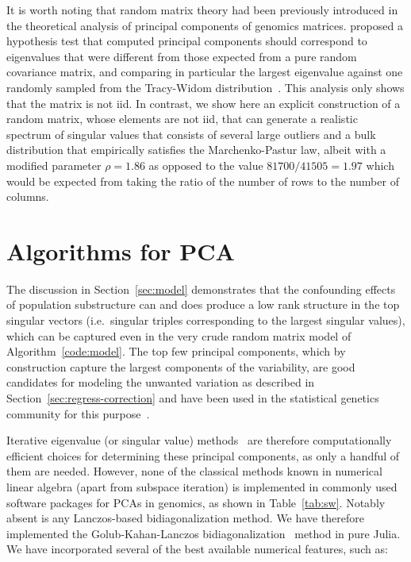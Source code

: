 \documentclass[review]{siamart0516}
\begin{document}
It is worth noting that random matrix theory had been previously introduced in
the theoretical analysis of principal components of genomics matrices.
\cite{Patterson2006} proposed a hypothesis test that computed principal components
should correspond to eigenvalues that were different from those expected from a
pure random covariance matrix,
and comparing in particular the largest eigenvalue against one randomly sampled
from the Tracy-Widom distribution~\cite{Tracy1993,Tracy1994}.
This analysis only shows that the matrix is not iid. In contrast, we show here
an explicit construction of a random matrix, whose elements are not iid, that
can generate a realistic spectrum of singular values that consists of several
large outliers and a bulk distribution that empirically satisfies the
Marchenko-Pastur law, albeit with a modified parameter $\rho = 1.86$ as opposed
to the value $81700/41505=1.97$ which would be expected from taking the ratio of
the number of rows to the number of columns.


\section{Algorithms for PCA}

The discussion in Section~\ref{sec:model} demonstrates that the
confounding effects of population substructure can and does produce a low
rank structure in the top singular vectors (i.e.\ singular triples
corresponding to the largest singular values), which can be captured even
in the very crude random matrix model of Algorithm~\ref{code:model}. The
top few principal components,
which by construction capture the largest components of the variability, are
good candidates for modeling the unwanted variation as described in
Section~\ref{sec:regress-correction} and have been used in the statistical
genetics community for this
purpose~\cite{Chen2003,Patterson2006,Price2006,Zhu2002,Zhang2003}.

Iterative eigenvalue (or singular value)
methods~\cite{Bai2000} are therefore computationally efficient choices for
determining these principal components, as only a handful of them are needed.
However, none of the classical methods known in numerical linear algebra
(apart from subspace iteration) is implemented in commonly used software packages
for PCAs in genomics, as shown in Table~\ref{tab:sw}.
Notably absent is any Lanczos-based bidiagonalization method.
We have therefore implemented the Golub-Kahan-Lanczos bidiagonalization~\cite{Golub1965}
method in pure Julia\cite{Bezanson2012,Bezanson2015}.
We have incorporated several of the best available numerical features, such as:
\end{document}
